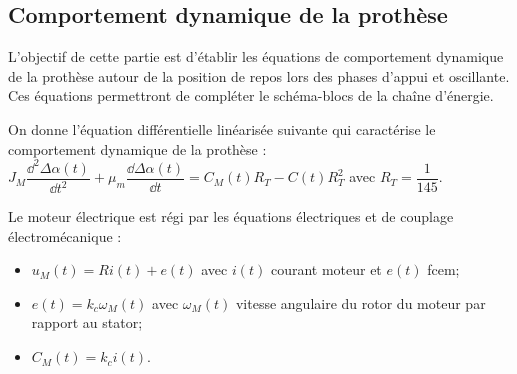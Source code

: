 %
%
%
\fi

\subsection*{Comportement dynamique de la prothèse}
\ifprof
\else
\begin{obj}
L'objectif de cette partie est d'établir les équations de comportement dynamique de la prothèse autour de
la position de repos lors des phases d'appui et oscillante. Ces équations permettront de compléter le schéma-blocs
de la chaîne d'énergie.
\end{obj}


On donne l'équation différentielle linéarisée suivante qui caractérise le comportement dynamique de la prothèse :
$
J_M \dfrac{\dd^2 \Delta \alpha(t) }{\dd t^2} + \mu_m \dfrac{\dd \Delta \alpha(t) }{\dd t} = C_M(t)R_T -C(t)R_T^2$  avec  $R_T = \dfrac{1}{145}$.

Le moteur électrique est régi par les équations électriques et de couplage électromécanique :
\begin{itemize}
\item $u_M (t )=Ri (t)+e(t)$ avec $i (t )$ courant moteur et $e(t )$ fcem;
\item $e (t )=k_c \omega_M (t )$ avec $\omega_M (t )$ vitesse angulaire du rotor du moteur par rapport au stator;
\item $C_M (t )=k_c i (t )$.
\end{itemize}


%
%

